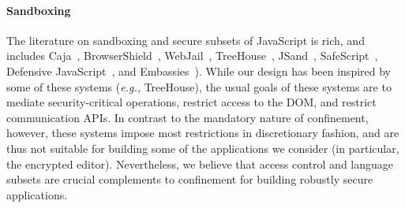 \paragraph{Sandboxing}
The literature on sandboxing and secure subsets of JavaScript is rich,
and includes Caja~\cite{GoogleCaja}, BrowserShield~\cite{Reis:2007},
WebJail~\cite{VanAcker:2011}, TreeHouse~\cite{Ingram:2012},
JSand~\cite{Agten:2012:JCC}, SafeScript~\cite{SafeScript}, Defensive
JavaScript~\cite{djs}, and Embassies~\cite{Howell:2013}).
%
While our design has been inspired by some of these systems (\emph{e.g.,}
TreeHouse), the usual goals of these systems are to mediate
security-critical operations, restrict access to the DOM, and restrict
communication APIs\@.
%
In contrast to the mandatory nature of confinement, however, these
systems impose most restrictions in discretionary fashion, and are
thus not suitable for building some of the applications we consider
(in particular, the encrypted editor).
%
Nevertheless, we believe that access control and language subsets are
crucial complements to confinement for building robustly secure
applications.


